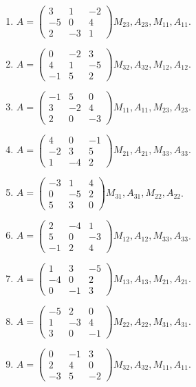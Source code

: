 \begin{enumerate}[label=\arabic*.,  leftmargin=*]
\item $A=\begin{pmatrix}3&1&-2\\-5&0&4\\2&-3&1\end{pmatrix}$\quad $M_{23}, A_{23}, M_{11}, A_{11}$.
\item $A=\begin{pmatrix}0&-2&3\\4&1&-5\\-1&5&2\end{pmatrix}$\quad $M_{32}, A_{32}, M_{12}, A_{12}$.
\item $A=\begin{pmatrix}-1&5&0\\3&-2&4\\2&0&-3\end{pmatrix}$\quad $M_{11}, A_{11}, M_{23}, A_{23}$.
\item $A=\begin{pmatrix}4&0&-1\\-2&3&5\\1&-4&2\end{pmatrix}$\quad $M_{21}, A_{21}, M_{33}, A_{33}$.
\item $A=\begin{pmatrix}-3&1&4\\0&-5&2\\5&3&0\end{pmatrix}$\quad $M_{31}, A_{31}, M_{22}, A_{22}$.
\item $A=\begin{pmatrix}2&-4&1\\5&0&-3\\-1&2&4\end{pmatrix}$\quad $M_{12}, A_{12}, M_{33}, A_{33}$.
\item $A=\begin{pmatrix}1&3&-5\\-4&0&2\\0&-1&3\end{pmatrix}$\quad $M_{13}, A_{13}, M_{21}, A_{21}$.
\item $A=\begin{pmatrix}-5&2&0\\1&-3&4\\3&0&-1\end{pmatrix}$\quad $M_{22}, A_{22}, M_{31}, A_{31}$.
\item $A=\begin{pmatrix}0&-1&3\\2&4&0\\-3&5&-2\end{pmatrix}$\quad $M_{32}, A_{32}, M_{11}, A_{11}$.

\end{enumerate}
